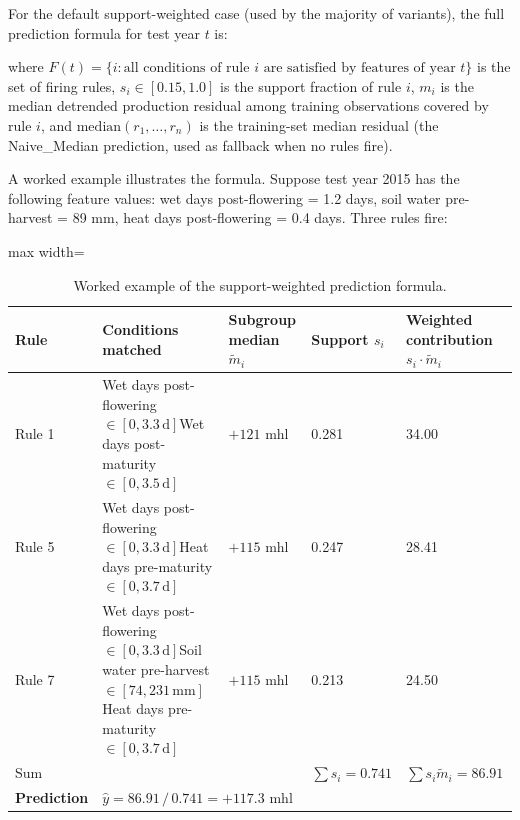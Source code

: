For the default support-weighted case (used by the majority of variants), the full prediction formula for test year $t$ is:

where $F(t) = \{i : \text{all conditions of rule } i \text{ are satisfied by features of year } t\}$ is the set of firing rules, $s_i \in [0.15, 1.0]$ is the support fraction of rule $i$, $m_i$ is the median detrended production residual among training observations covered by rule $i$, and $\mathrm{median}(r_1, \ldots, r_n)$ is the training-set median residual (the Naive\_Median prediction, used as fallback when no rules fire).

A worked example illustrates the formula. Suppose test year 2015 has the following feature values: wet days post-flowering = 1.2 days, soil water pre-harvest = 89 mm, heat days post-flowering = 0.4 days. Three rules fire:

\begin{table}[htbp]
  \centering
  \caption{Worked example of the support-weighted prediction formula.}\label{tab:ch3b_2}
  \small
  \begin{adjustbox}{max width=\textwidth}
    \begin{tabularx}{\textwidth}{p{1.2cm} X p{2.5cm} p{1.8cm} p{3cm}}
    \toprule
    \textbf{Rule} & \textbf{Conditions matched} & \textbf{Subgroup median $\tilde{m}_i$} & \textbf{Support $s_i$} & \textbf{Weighted contribution $s_i \cdot \tilde{m}_i$} \\
    \midrule
    Rule 1
      & Wet days post-flowering $\in [0, 3.3\,\text{d}]$\newline Wet days post-maturity $\in [0, 3.5\,\text{d}]$
      & $+121$ mhl & 0.281 & 34.00 \\[6pt]
    Rule 5
      & Wet days post-flowering $\in [0, 3.3\,\text{d}]$\newline Heat days pre-maturity $\in [0, 3.7\,\text{d}]$
      & $+115$ mhl & 0.247 & 28.41 \\[6pt]
    Rule 7
      & Wet days post-flowering $\in [0, 3.3\,\text{d}]$\newline Soil water pre-harvest $\in [74, 231\,\text{mm}]$\newline Heat days pre-maturity $\in [0, 3.7\,\text{d}]$
      & $+115$ mhl & 0.213 & 24.50 \\[6pt]
    \midrule
    Sum   & & & $\sum s_i = 0.741$ & $\sum s_i \tilde{m}_i = 86.91$ \\[4pt]
    \textbf{Prediction} & \multicolumn{4}{l}{$\hat{y} = 86.91\,/\,0.741 = +117.3$ mhl} \\
    \bottomrule
  \end{tabularx}
  \end{adjustbox}

\end{table}


